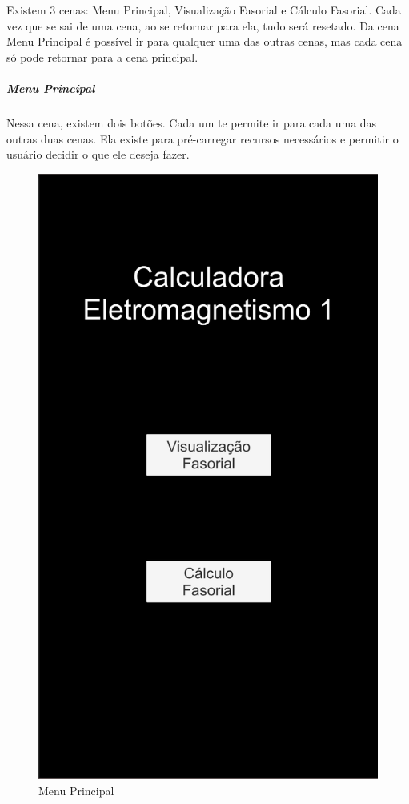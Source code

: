 \documentclass[conference,harvard, brazil]{sbatex}
\begin{document}
	Existem 3 cenas: Menu Principal, Visualização Fasorial e Cálculo Fasorial. Cada vez que se sai de uma cena, ao se retornar para ela, tudo será resetado. Da cena Menu Principal é possível ir para qualquer uma das outras cenas, mas cada cena só pode retornar para a cena principal.
	\subparagraph{Menu Principal}Nessa cena, existem dois botões. Cada um te permite ir para cada uma das outras duas cenas. Ela existe para pré-carregar recursos necessários e permitir o usuário decidir o que ele deseja fazer.
	\begin{figure}[h]
		\centering
		\includegraphics[scale=0.25]{app_1}
		\caption{Menu Principal}
	\end{figure}
\end{document}
